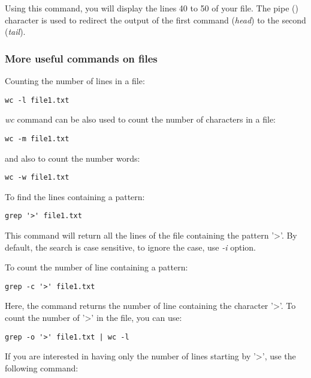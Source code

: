 \documentclass[two_sides]{my_article}
\begin{document}
Using this command, you will display the lines 40 to 50 of your file. The pipe (\textbar) character is used to redirect the output of the first command (\emph{head}) to the second (\emph{tail}).

\subsubsection{More useful commands on files}

Counting the number of lines in a file:

\begin{lstlisting}[frame=lines, numbers=none]
wc -l file1.txt
\end{lstlisting}

\emph{wc} command can be also used to count the number of characters in a file:

\begin{lstlisting}[frame=lines, numbers=none]
wc -m file1.txt
\end{lstlisting}

and also to count the number words:

\begin{lstlisting}[frame=lines, numbers=none]
wc -w file1.txt
\end{lstlisting}

To find the lines containing a pattern:

\begin{lstlisting}[frame=lines, numbers=none]
grep '>' file1.txt
\end{lstlisting}

This command will return all the lines of the file containing the pattern '\textgreater'. By default, the search is case sensitive, to ignore the case, use \emph{-i} option.

To count the number of line containing a pattern:

\begin{lstlisting}[frame=lines, numbers=none]
grep -c '>' file1.txt
\end{lstlisting}

Here, the command returns the number of line containing the character '\textgreater'. To count the number of '\textgreater' in the file, you can use:

\begin{lstlisting}[frame=lines, numbers=none]
grep -o '>' file1.txt | wc -l
\end{lstlisting}

If you are interested in having only the number of lines starting by '\textgreater', use the following command:
\end{document}
